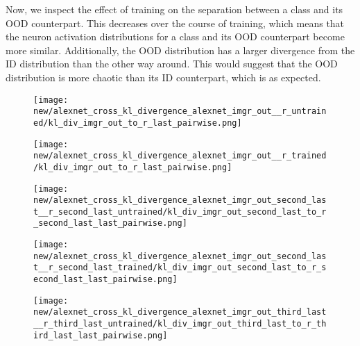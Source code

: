 \documentclass{article}
\begin{document}
            Now, we inspect the effect of training on the separation between a class and its OOD counterpart. This decreases over the course of training, which means that the neuron activation distributions for a class and its OOD counterpart become more similar. Additionally, the OOD distribution has a larger divergence from the ID distribution than the other way around. This would suggest that the OOD distribution is more chaotic than its ID counterpart, which is as expected. 
            
            \begin{figure}[H]
                \centering
                \begin{minipage}{0.45\textwidth}
                    \centering
                    \texttt{[image: new/alexnet\_cross\_kl\_divergence\_alexnet\_imgr\_out\_\_r\_untrained/kl\_div\_imgr\_out\_to\_r\_last\_pairwise.png]}
                    
                \end{minipage}\hfill
                \begin{minipage}{0.45\textwidth}
                    \centering
                    \texttt{[image: new/alexnet\_cross\_kl\_divergence\_alexnet\_imgr\_out\_\_r\_trained/kl\_div\_imgr\_out\_to\_r\_last\_pairwise.png]}
                \end{minipage}
                \begin{minipage}{0.45\textwidth}
                    \centering
                    \texttt{[image: new/alexnet\_cross\_kl\_divergence\_alexnet\_imgr\_out\_second\_last\_\_r\_second\_last\_untrained/kl\_div\_imgr\_out\_second\_last\_to\_r\_second\_last\_last\_pairwise.png]}
                    
                \end{minipage}\hfill
                \begin{minipage}{0.45\textwidth}
                    \centering
                    \texttt{[image: new/alexnet\_cross\_kl\_divergence\_alexnet\_imgr\_out\_second\_last\_\_r\_second\_last\_trained/kl\_div\_imgr\_out\_second\_last\_to\_r\_second\_last\_last\_pairwise.png]}
                \end{minipage}
                \begin{minipage}{0.45\textwidth}
                    \centering
                    \texttt{[image: new/alexnet\_cross\_kl\_divergence\_alexnet\_imgr\_out\_third\_last\_\_r\_third\_last\_untrained/kl\_div\_imgr\_out\_third\_last\_to\_r\_third\_last\_last\_pairwise.png]}
                    

\end{minipage}
\end{figure}
\end{document}
